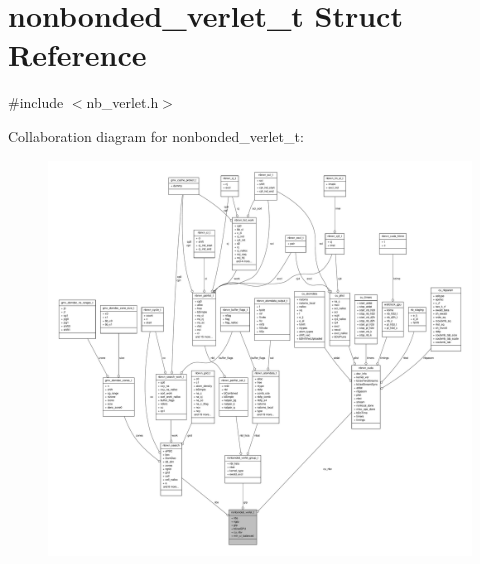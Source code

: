 \hypertarget{structnonbonded__verlet__t}{\section{nonbonded\-\_\-verlet\-\_\-t \-Struct \-Reference}
\label{structnonbonded__verlet__t}
}


{\ttfamily \#include $<$nb\-\_\-verlet.\-h$>$}



\-Collaboration diagram for nonbonded\-\_\-verlet\-\_\-t\-:
\nopagebreak
\begin{figure}[H]
\begin{center}
\leavevmode
\includegraphics[width=350pt]{structnonbonded__verlet__t__coll__graph}
\end{center}
\end{figure}
